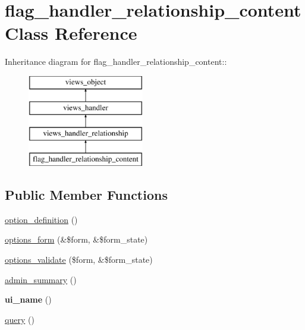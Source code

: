 \hypertarget{classflag__handler__relationship__content}{
\section{flag\_\-handler\_\-relationship\_\-content Class Reference}
\label{classflag__handler__relationship__content}
}
Inheritance diagram for flag\_\-handler\_\-relationship\_\-content::\begin{figure}[H]
\begin{center}
\leavevmode
\includegraphics[height=4cm]{classflag__handler__relationship__content}
\end{center}
\end{figure}
\subsection*{Public Member Functions}
\begin{CompactItemize}
\item 
\hyperlink{classflag__handler__relationship__content_54e7c1074698289ef34aa1cdd31db4bf}{option\_\-definition} ()
\item 
\hyperlink{classflag__handler__relationship__content_16476e401490907a6fadc9af5156d83f}{options\_\-form} (\&\$form, \&\$form\_\-state)
\item 
\hyperlink{classflag__handler__relationship__content_18742b6cac14664ca2880c9b3bf96feb}{options\_\-validate} (\$form, \&\$form\_\-state)
\item 
\hyperlink{classflag__handler__relationship__content_d5dd884b0fe1765d43a268baf16057ef}{admin\_\-summary} ()
\item 
\hypertarget{classflag__handler__relationship__content_848ffaa48ca44731d46e860f22d73cb6}{
\textbf{ui\_\-name} ()}
\label{classflag__handler__relationship__content_848ffaa48ca44731d46e860f22d73cb6}

\item 
\hyperlink{classflag__handler__relationship__content_7fcb01763f0902dafd9f601c0bc1a612}{query} ()
\end{CompactItemize}


